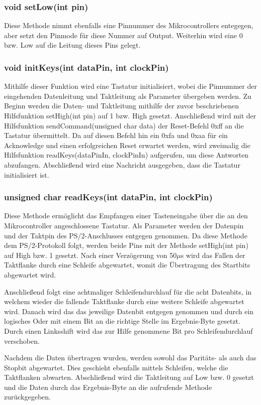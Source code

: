 \subsubsection{void setLow(int pin)}
Diese Methode nimmt ebenfalls eine Pinnummer des Mikrocontrollers entegegen, aber setzt den Pinmode für diese Nummer auf Output. Weiterhin wird eine 0 bzw. Low auf die Leitung dieses Pins gelegt.

\subsubsection{void initKeys(int dataPin, int clockPin)}
Mithilfe dieser Funktion wird eine Tastatur initialisiert, wobei die Pinnummer der eingehenden Datenleitung und Taktleitung als Parameter übergeben werden. Zu Beginn werden die Daten- und Taktleitung mithilfe der zuvor beschriebenen Hilfsfunktion setHigh(int pin) auf 1 bzw. High gesetzt. Anschließend wird mit der Hilfsfunktion sendCommand(unsigned char data) der Reset-Befehl 0xff an die Tastatur übermittelt. Da auf diesen Befehl hin ein 0xfa und 0xaa für ein Acknowledge und einen erfolgreichen Reset erwartet werden, wird zweimalig die Hilfsfunktion readKeys(dataPinIn, clockPinIn) aufgerufen, um diese Antworten abzufangen. Abschließend wird eine Nachricht ausgegeben, dass die Tastatur initialisiert ist.

\subsubsection{unsigned char readKeys(int dataPin, int clockPin)}
Diese Methode ermöglicht das Empfangen einer Tasteneingabe über die an den Mikrocontroller angeschlossene Tastatur. Als Parameter werden der Datenpin und der Taktpin des PS/2-Anschlusses entgegen genommen. Da diese Methode dem PS/2-Protokoll folgt, werden beide Pins mit der Methode setHigh(int pin) auf High bzw. 1 gesetzt. Nach einer Verzögerung von 50$\mu$s wird das Fallen der Taktflanke durch eine Schleife abgewartet, womit die Übertragung des Startbits abgewartet wird.

Anschließend folgt eine achtmaliger Schleifendurchlauf für die acht Datenbits, in welchem wieder die fallende Taktflanke durch eine weitere Schleife abgewartet wird. Danach wird das das jeweilige Datenbit entgegen genommen und durch ein logisches Oder mit einem Bit an die richtige Stelle im Ergebnis-Byte gesetzt. Durch einen Linksshift wird das zur Hilfe genommene Bit pro Schleifendurchlauf verschoben.

Nachdem die Daten übertragen wurden, werden sowohl das Paritäts- als auch das Stopbit abgewartet. Dies geschieht ebenfalls mittels Schleifen, welche die Taktflanken abwarten. Abschließend wird die Taktleitung auf Low bzw. 0 gesetzt und die Daten durch das Ergebnis-Byte an die aufrufende Methode zurückgegeben.

